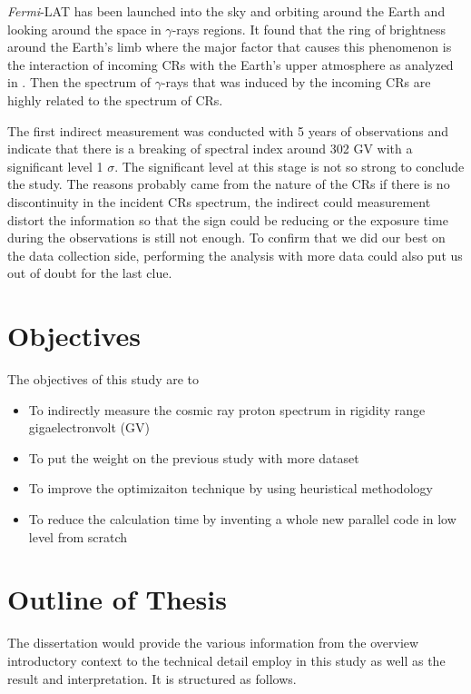\textit{Fermi}-LAT has been launched into the sky and orbiting around the
Earth and looking around the space in $\gamma$-rays regions.
It found that the ring of brightness around the Earth's limb where 
the major factor that causes this phenomenon is the interaction of 
incoming CRs with the Earth's upper atmosphere as analyzed in \cite{FermiEarth09}.
Then the spectrum of $\gamma$-rays that was induced by the incoming 
CRs are highly related to the spectrum of CRs.


The first indirect measurement was conducted with 5 years of
observations and indicate that there is a breaking of spectral
index around 302 GV with a significant level 1 $\sigma$.
The significant level at this stage is not so strong to conclude the 
study. The reasons probably came from the nature of the CRs if there 
is no discontinuity in the incident CRs spectrum, the indirect could 
measurement distort the information so that the sign could be reducing
or the exposure time during the observations is still not enough.
To confirm that we did our best on the data
collection side, performing the analysis with more data could also 
put us out of doubt for the last clue.


\section{Objectives}
The objectives of this study are to 
\begin{itemize}
    \item To indirectly measure the cosmic ray proton spectrum in rigidity range gigaelectronvolt (GV)
    \item To put the weight on the previous study with more dataset
    \item To improve the optimizaiton technique by using heuristical methodology
    \item To reduce the calculation time by inventing a whole new
    parallel code in low level from scratch
\end{itemize}


\section{Outline of Thesis}
The dissertation would provide the various information from the
overview introductory context to the technical detail employ
in this study as well as the result and interpretation. It is 
structured as follows.

